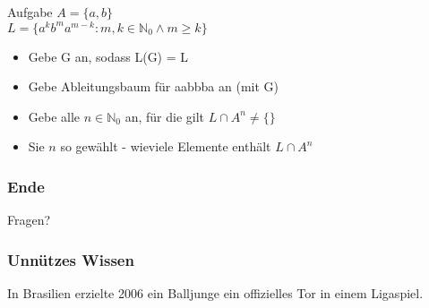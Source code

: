 \documentclass{beamer}
\begin{document}
\begin{frame}
	\begin{block}{Aufgabe}
		$ A = \{a,b\}$\\
		$ L = \{a^kb^ma^{m-k} : m,k \in \mathbb{N}_0 \land m \ge k\} $
		\begin{itemize}
			\item Gebe G an, sodass L(G) = L
			\item Gebe Ableitungsbaum für aabbba an (mit G)
			\item Gebe alle $n \in \mathbb{N}_0$ an, für die gilt $L \cap A^n \not= \{\}$
			\item Sie $n$ so gewählt - wieviele Elemente enthält  $L \cap A^n$
		\end{itemize}
	\end{block}
\end{frame}

\begin {frame}
\frametitle {Ende}
	\begin {center}
	Fragen?
	\end {center}
\end {frame}

\begin{frame}
	\frametitle{Unnützes Wissen}
	\begin{center}
		In Brasilien erzielte 2006 ein Balljunge ein offizielles Tor in einem Ligaspiel.
	\end{center}
\end{frame}
\end{document}
